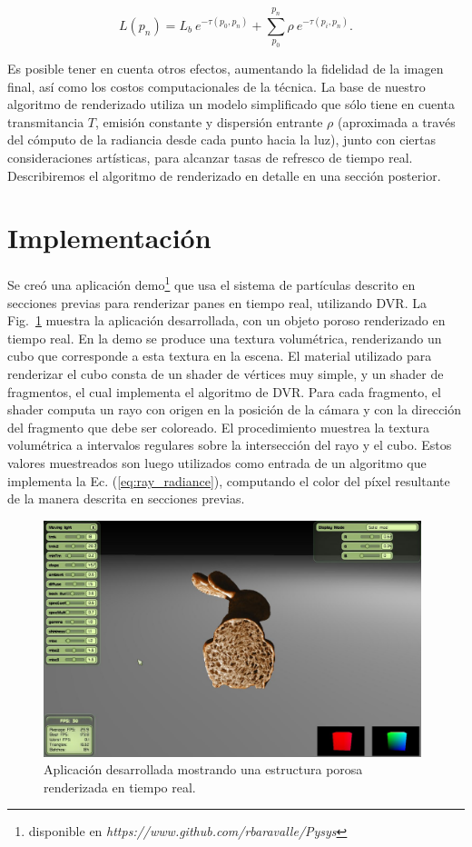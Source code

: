 \begin{equation} \label{eq:ray_radiance}  
  L(p_n) = L_b \ e^{-\tau(p_0, p_n)} + \sum_{p_0}^{p_n} \rho \ e^{-\tau(p_i,p_n)}.
\end{equation}

Es posible tener en cuenta otros efectos, aumentando la fidelidad de la imagen final, así como los costos computacionales de la técnica.
La base de nuestro algoritmo de renderizado utiliza un modelo simplificado que sólo tiene en cuenta transmitancia $T$, emisión constante y dispersión entrante $\rho$ (aproximada a través del cómputo de la radiancia desde cada punto hacia la luz), junto con ciertas consideraciones artísticas, para alcanzar tasas de refresco de tiempo real.
Describiremos el algoritmo de renderizado en detalle en una sección posterior.

\section{Implementación}

Se creó una aplicación demo\footnote{disponible en \emph{https://www.github.com/rbaravalle/Pysys}}  que usa el sistema de partículas descrito en secciones previas para renderizar panes en tiempo real, utilizando DVR.
La Fig.~\ref{fg:application} muestra la aplicación desarrollada, con un objeto poroso renderizado en tiempo real.
En la demo se produce una textura volumétrica, renderizando un cubo que corresponde a esta textura en la escena.
El material utilizado para renderizar el cubo consta de un shader de vértices muy simple, y un shader de fragmentos, el cual implementa el algoritmo de DVR.
Para cada fragmento, el shader computa un rayo con origen en la posición de la cámara y con la dirección del fragmento que debe ser coloreado.
El procedimiento muestrea la textura volumétrica a intervalos regulares sobre la intersección del rayo y el cubo.
Estos valores muestreados son luego utilizados como entrada de un algoritmo que implementa la Ec. (\ref{eq:ray_radiance}), computando el color del píxel resultante de la manera descrita en secciones previas.



\begin{figure}
\centerline{\includegraphics[width=11cm]{figures/application}}
\caption{Aplicación desarrollada mostrando una estructura porosa renderizada en tiempo real.}
\label{fg:application}
\end{figure}


